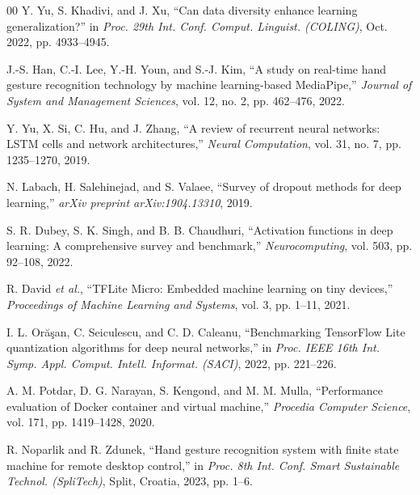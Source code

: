 \begin{thebibliography}{00}
Y. Yu, S. Khadivi, and J. Xu, ``Can data diversity enhance learning generalization?'' in \textit{Proc. 29th Int. Conf. Comput. Linguist. (COLING)}, Oct. 2022, pp. 4933--4945.

J.-S. Han, C.-I. Lee, Y.-H. Youn, and S.-J. Kim, ``A study on real-time hand gesture recognition technology by machine learning-based MediaPipe,'' \textit{Journal of System and Management Sciences}, vol. 12, no. 2, pp. 462--476, 2022.

Y. Yu, X. Si, C. Hu, and J. Zhang, ``A review of recurrent neural networks: LSTM cells and network architectures,'' \textit{Neural Computation}, vol. 31, no. 7, pp. 1235--1270, 2019.

N. Labach, H. Salehinejad, and S. Valaee, ``Survey of dropout methods for deep learning,'' \textit{arXiv preprint arXiv:1904.13310}, 2019.

S. R. Dubey, S. K. Singh, and B. B. Chaudhuri, ``Activation functions in deep learning: A comprehensive survey and benchmark,'' \textit{Neurocomputing}, vol. 503, pp. 92--108, 2022.

R. David \textit{et al.}, ``TFLite Micro: Embedded machine learning on tiny devices,'' \textit{Proceedings of Machine Learning and Systems}, vol. 3, pp. 1--11, 2021.

I. L. Orăşan, C. Seiculescu, and C. D. Caleanu, ``Benchmarking TensorFlow Lite quantization algorithms for deep neural networks,'' in \textit{Proc. IEEE 16th Int. Symp. Appl. Comput. Intell. Informat. (SACI)}, 2022, pp. 221--226.

A. M. Potdar, D. G. Narayan, S. Kengond, and M. M. Mulla, ``Performance evaluation of Docker container and virtual machine,'' \textit{Procedia Computer Science}, vol. 171, pp. 1419--1428, 2020.

R. Noparlik and R. Zdunek, ``Hand gesture recognition system with finite state machine for remote desktop control,'' in \textit{Proc. 8th Int. Conf. Smart Sustainable Technol. (SpliTech)}, Split, Croatia, 2023, pp. 1--6.


\end{thebibliography}
